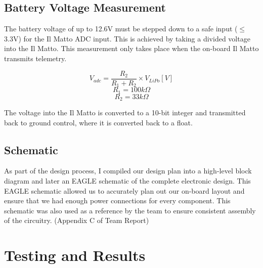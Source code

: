 \documentclass[a4paper,11pt]{article}
\begin{document}
\subsection{Battery Voltage Measurement}
The battery voltage of up to 12.6V must be stepped down to a safe input ($\leq$3.3V) for the Il Matto ADC input. This is achieved by taking a divided voltage into the Il Matto. This measurement only takes place when the on-board Il Matto transmits telemetry.

\begin{equation}
V_{adc} = \frac{R_2}{R_1 + R_2}\times V_{LiPo} [V]
\label{eqn:battery voltage}
\end{equation}
\[ R_1 = 100k\Omega \] 
\[R_2 = 33k\Omega \]

The voltage into the Il Matto is converted to a 10-bit integer and transmitted back to ground control, where it is converted back to a float.

\subsection{Schematic}
As part of the design process, I compiled our design plan into a high-level block diagram and later an EAGLE schematic of the complete electronic design. This EAGLE schematic allowed us to accurately plan out our on-board layout and ensure that we had enough power connections for every component. This schematic was also used as a reference by the team to ensure consistent assembly of the circuitry. (Appendix C of Team Report)



\section{Testing and Results}
\end{document}
